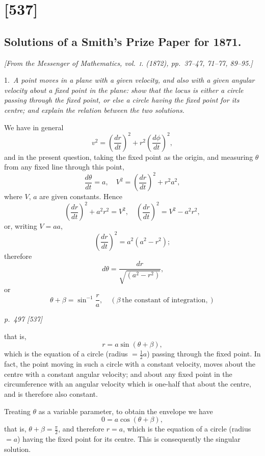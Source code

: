 \documentclass[11pt,a4paper]{article}
\theoremstyle{plain}
\theoremstyle{definition}
\newcommand{\dd}{\,d}
\begin{document}
\section{[537]}
\subsection{Solutions of a Smith's Prize Paper for 1871.}

\begin{center}
\textit{[From the Messenger of Mathematics, vol.~\textsc{i}. (1872), pp.~37--47, 71--77, 89--95.]}
\end{center}

\noindent\textsc{1.}\, \textit{A point moves in a plane with a given velocity, and also with a given angular
velocity about a fixed point in the plane: show that the locus is either a circle passing through
the fixed point, or else a circle having the fixed point for its centre; and explain the
relation between the two solutions.}

We have in general
\[
v^2 = \left(\frac{dr}{dt}\right)^2 + r^2\left(\frac{d\phi}{dt}\right)^2,
\]
and in the present question, taking the fixed point as the origin, and measuring $\theta$
from any fixed line through this point,
\[
\frac{d\theta}{dt} = a, \quad V^2 = \left(\frac{dr}{dt}\right)^2 + r^2 a^2,
\]
where $V$, $a$ are given constants. Hence
\[
\left(\frac{dr}{dt}\right)^2 + a^2 r^2 = V^2, \quad \left(\frac{dr}{dt}\right)^2 = V^2 - a^2 r^2,
\]
or, writing $V = a a$,
\[
\left(\frac{dr}{dt}\right)^2 = a^2(a^2 - r^2);
\]
therefore
\[
\dd\theta = \frac{dr}{\sqrt{(a^2 - r^2)}},
\]
or
\[
\theta + \beta = \sin^{-1}\frac{r}{a}, \quad (\beta\ \text{the constant of integration},)
\]

\clearpage

\bigskip
\textit{p.~497 [537]}
\smallskip

\noindent
that is,
\[
r = a\sin(\theta + \beta),
\]
which is the equation of a circle (radius $= \frac{1}{2}a$) passing through the fixed point. In
fact, the point moving in such a circle with a constant velocity, moves about the
centre with a constant angular velocity; and about any fixed point in the circumference
with an angular velocity which is one-half that about the centre, and is therefore
also constant.

Treating $\theta$ as a variable parameter, to obtain the envelope we have
\[
0 = a\cos(\theta + \beta),
\]
that is, $\theta + \beta = \frac{\pi}{2}$, and therefore $r = a$, which is the equation of a circle (radius $= a$)
having the fixed point for its centre. This is consequently the singular solution.
\end{document}
